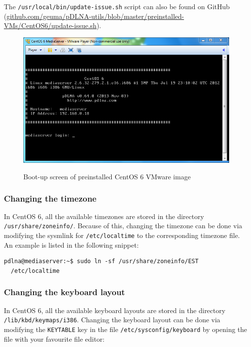 \documentclass[a4paper,oneside,10pt]{report}
\newenvironment{colframecmd}{%
  \begin{Sbox}
    \begin{minipage}{.99\columnwidth}
}{%
  \end{minipage}
  \end{Sbox}
  \begin{center}
    \fcolorbox{black}{LightSteelBlue}{\TheSbox}
  \end{center}
}
\begin{document}
The \verb|/usr/local/bin/update-issue.sh| script can also be found on GitHub (\url{github.com/geuma/pDLNA-utils/blob/master/preinstalled-VMs/CentOS6/update-issue.sh}).

\begin{figure}
	\centering
		\includegraphics[width=34em]{images/vm_centos6_loginscreen}
	\label{fig:centos6-loginscreen}
	\caption{Boot-up screen of preinstalled CentOS 6 VMware image}
\end{figure}

\subsubsection{Changing the timezone}

In CentOS 6, all the available timezones are stored in the directory \verb|/usr/share/zoneinfo/|. Because of this, changing the timezone can be done via modifying the sysmlink for \verb|/etc/localtime| to the corresponding timezone file. An example is listed in the following snippet:

\begin{colframecmd}
\begin{verbatim}
pdlna@mediaserver:~$ sudo ln -sf /usr/share/zoneinfo/EST
  /etc/localtime
\end{verbatim}
\end{colframecmd}

\subsubsection{Changing the keyboard layout}

In CentOS 6, all the available keyboard layouts are stored in the directory \verb|/lib/kbd/keymaps/i386|. Changing the keyboard layout can be done via modifying the \verb|KEYTABLE| key in the file \verb|/etc/sysconfig/keyboard| by opening the file with your favourite file editor:
\end{document}
